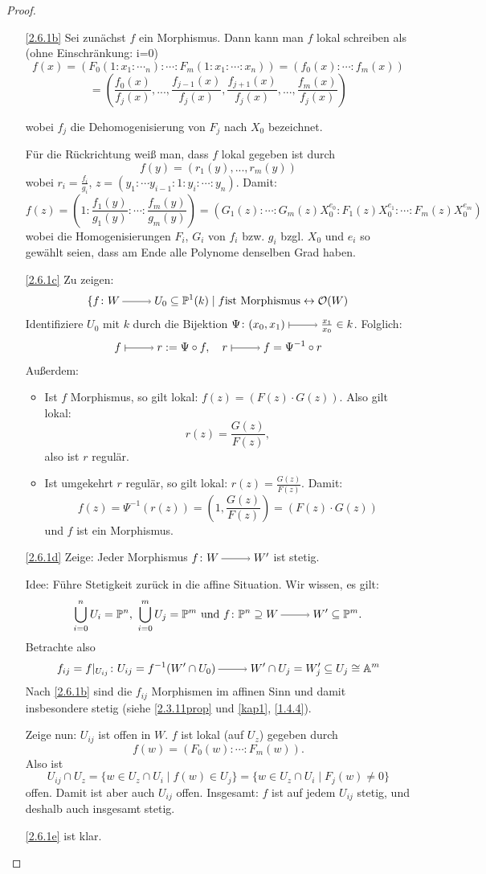 \documentclass[a4paper,12pt]{scrbook}
\newtheorem{proof}{Beweis}
\def\A{\mathbb{A}}
\def\O{\mathcal{O}}
\def\P{\mathbb{P}}
\newcommand{\restrict}[1]{|_{#1}}
\renewcommand{\dotsc}{\ensuremath{\!...}}
\newcommand{\ra}{\raisebox{-1pt}{\tikz{\draw[thin,shorten >=3pt, ->] (0,0) node{\hspace*{-2pt}} -- node{} (1,0);}}\penalty1000\relax}
\renewcommand{\mapsto}{\raisebox{-1pt}{\tikz{\draw[thin,shorten >=3pt, |->] (0,0) node{\hspace*{0pt}} -- node{} (1,0);}}\penalty1000\relax}
\begin{document}
\begin{proof}
  \begin{enumerate}
  \item[\ref{2.6.1b}] Sei zunächst $f$ ein Morphismus. Dann kann man $f$ lokal schreiben als (ohne Einschränkung: i=0)
\[f(x)=(F_0(1:x_1:\dotsm_n):\dotsm:F_m(1:x_1:\dotsm:x_n))=(f_0(x):\dotsm :f_m(x))\]
\[=(\frac {f_0(x)}{f_j(x)},\dotsc,\frac{f_{j-1}(x)}{f_j(x)},\frac{f_{j+1}(x)}{f_j(x)},\dotsc,\frac {f_m(x)}{f_j(x)})\]

wobei $f_j$ die Dehomogenisierung von $F_j$ nach $X_0$ bezeichnet.

Für die Rückrichtung weiß man, dass $f$ lokal gegeben ist durch 
\[f(y)=(r_1(y),\dotsc,r_m(y))\]
wobei $r_i=\frac{f_i}{g_i}$, $z=(y_1:\dotsm y_{i-1}:1:y_i:\dotsm :y_n)$. Damit:
\[ f(z)=(1:\frac{f_1(y)}{g_1(y)}:\dotsm :\frac{f_m(y)}{g_m(y)})=(G_1(z):\dotsm :G_m(z)X_0^{e_0}:F_1(z)X_0^{e_1}: \dotsm :F_m(z)X_0^{e_m})\]
wobei die Homogenisierungen $F_i$, $G_i$ von $f_i$ bzw. $g_i$ bzgl. $X_0$ und $e_i$ so gewählt seien, dass am Ende alle Polynome denselben Grad haben.  
  \item[\ref{2.6.1c}] Zu zeigen:
\[\{f\colon W\ra U_0\subseteq \P^1(k) \mid f \text{ist Morphismus} \leftrightarrow \O(W)\]
Identifiziere $U_0$ mit $k$ durch die Bijektion $\Psi \colon (x_0,x_1)\mapsto \frac{x_1}{x_0} \in k$. Folglich:
\[f\mapsto r:=\Psi \circ f, \quad r\mapsto f=\Psi^{-1}\circ r\]
{\sc Außerdem:}\begin{itemize}
    \item Ist $f$ Morphismus, so gilt lokal: $f(z)=(F(z)\cdot G(z))$. Also gilt lokal: \[r(z)=\frac{G(z)}{F(z)},\] also ist $r$ regulär.
    \item Ist umgekehrt $r$ regulär, so gilt lokal: $r(z)=\frac{G(z)}{F(z)}$. Damit: 
\[f(z)=\Psi^{-1}(r(z))=(1,\frac{G(z)}{F(z)})=(F(z)\cdot G(z))\]
und $f$ ist ein Morphismus.\end{itemize}

  \item[\ref{2.6.1d}] {\sc Zeige:} Jeder Morphismus $f\colon W\ra W'$ ist stetig.

 {\sc Idee:} Führe Stetigkeit zurück in die affine Situation.
Wir wissen, es gilt:
\[\bigcup_{i=0}^{n}U_i=\P^n,\ \bigcup_{i=0}^{m}U_j=\P^m\text{ und } f\colon \P^n \supseteq W\ra W'\subseteq \P^m.\]
Betrachte also
\[ f_{ij}=f\restrict{U_{ij}} \colon U_{ij}=f^{-1}(W'\cap U_0)\ra W'\cap U_j=W_j'\subseteq U_j\cong \A^m\]
Nach \ref{2.6.1b} sind die $f_{ij}$ Morphismen im affinen Sinn und damit insbesondere stetig (siehe \cref{2.3.11prop} und \cref{kap1}, \cref{1.4.4}).

Zeige nun: $U_{ij}$ ist offen in $W$. $f$ ist lokal (auf $U_z$) gegeben durch 
\[f(w)=(F_0(w):\dotsm :F_m(w)).\]
Also ist 
\[U_{ij}\cap U_z=\{w \in U_z\cap U_i \mid f(w) \in U_j\}=\{w \in U_z\cap U_i \mid F_j(w)\neq 0\}\]
offen. Damit ist aber auch $U_{ij}$ offen.
Insgesamt: $f$ ist auf jedem $U_{ij}$ stetig, und deshalb auch insgesamt stetig.
  \item[\ref{2.6.1e}] ist klar.
  \end{enumerate}  
\end{proof}
\end{document}
